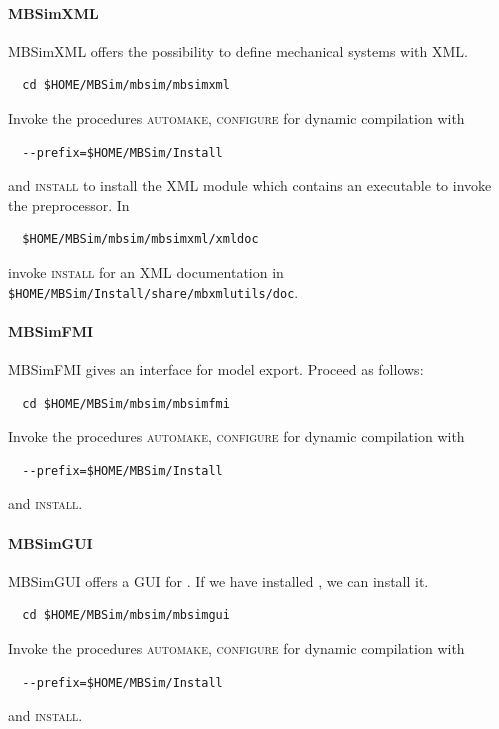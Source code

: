 \paragraph{MBSimXML}
MBSimXML offers the possibility to define mechanical systems with XML.
\begin{verbatim}
  cd $HOME/MBSim/mbsim/mbsimxml
\end{verbatim}
Invoke the procedures \textsc{automake, configure} for dynamic compilation with
\begin{verbatim}
  --prefix=$HOME/MBSim/Install
\end{verbatim}
and \textsc{install} to install the XML module which contains an executable to invoke the preprocessor. In
\begin{verbatim}
  $HOME/MBSim/mbsim/mbsimxml/xmldoc
\end{verbatim}
invoke \textsc{install} for an XML documentation in\\
\texttt{\$HOME/MBSim/Install/share/mbxmlutils/doc}.
%
\paragraph{MBSimFMI}
MBSimFMI gives an interface for model export. Proceed as follows:
\begin{verbatim}
  cd $HOME/MBSim/mbsim/mbsimfmi
\end{verbatim}
Invoke the procedures \textsc{automake, configure} for dynamic compilation with
\begin{verbatim}
  --prefix=$HOME/MBSim/Install
\end{verbatim}
and \textsc{install}.
%
\paragraph{MBSimGUI}
MBSimGUI offers a GUI for \MBSim{}. If we have installed \OpenMBV{}, we can install it.
\begin{verbatim}
  cd $HOME/MBSim/mbsim/mbsimgui
\end{verbatim}
Invoke the procedures \textsc{automake, configure} for dynamic compilation with
\begin{verbatim}
  --prefix=$HOME/MBSim/Install
\end{verbatim}
and \textsc{install}.

